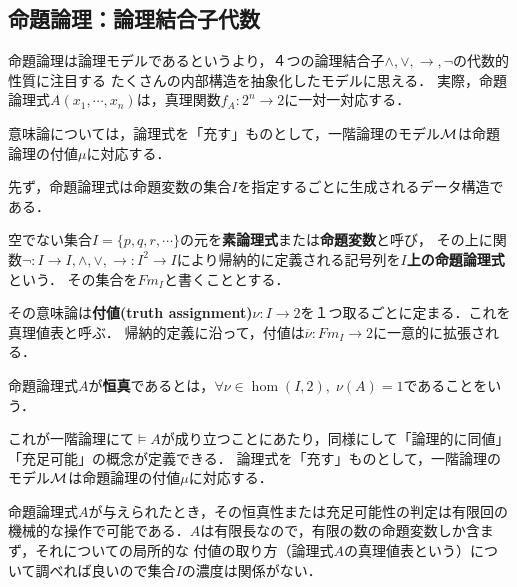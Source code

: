\documentclass[uplatex, dvipdfmx]{jsreport}
\begin{document}
\subsection{命題論理：論理結合子代数}

\begin{screen}
命題論理は論理モデルであるというより，４つの論理結合子$\land,\lor,\to,\lnot$の代数的性質に注目する
たくさんの内部構造を抽象化したモデルに思える．
実際，命題論理式$A(x_1,\cdots,x_n)$は，真理関数$f_A:2^n\to 2$に一対一対応する．

意味論については，論理式を「充す」ものとして，一階論理のモデル$\mathcal{M}$は命題論理の付値$\mu$に対応する．
\end{screen}

先ず，命題論理式は命題変数の集合$I$を指定するごとに生成されるデータ構造である．
\begin{definition}
    空でない集合$I=\{p,q,r,\cdots\}$の元を\textbf{素論理式}または\textbf{命題変数}と呼び，
    その上に関数$\lnot:I\to I,\land,\lor,\to:I^2\to I$により帰納的に定義される記号列を\textbf{$I$上の命題論理式}という．
    その集合を$Fm_I$と書くこととする．
\end{definition}

その意味論は\textbf{付値(truth assignment)}$\nu:I\to 2$を１つ取るごとに定まる．これを真理値表と呼ぶ．
帰納的定義に沿って，付値は$\overline{\nu}:Fm_I\to 2$に一意的に拡張される．

\begin{definition}[tautology]
    命題論理式$A$が\textbf{恒真}であるとは，$\forall\nu\in\hom(I,2),\;\nu(A)=1$であることをいう．
\end{definition}
これが一階論理にて$\vDash A$が成り立つことにあたり，同様にして「論理的に同値」「充足可能」の概念が定義できる．
論理式を「充す」ものとして，一階論理のモデル$\mathcal{M}$は命題論理の付値$\mu$に対応する．

\begin{remark}
    命題論理式$A$が与えられたとき，その恒真性または充足可能性の判定は有限回の機械的な操作で可能である．$A$は有限長なので，有限の数の命題変数しか含まず，それについての局所的な
    付値の取り方（論理式$A$の真理値表という）について調べれば良いので集合$I$の濃度は関係がない．
\end{remark}
\end{document}
